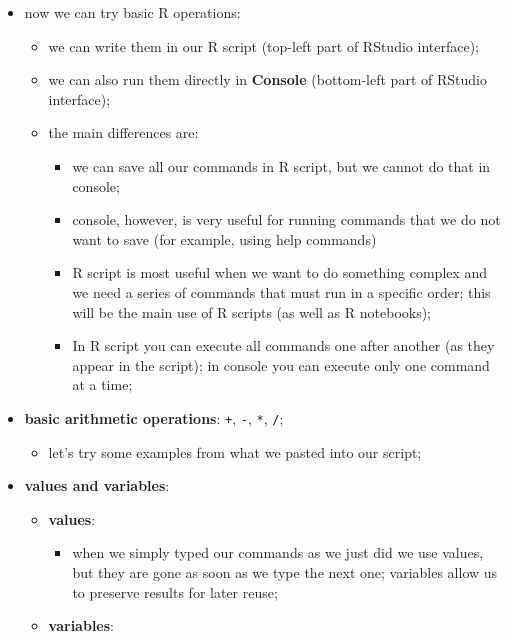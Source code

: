 \documentclass[
]{book}
\providecommand{\tightlist}{%
  \setlength{\itemsep}{0pt}\setlength{\parskip}{0pt}}
\begin{document}
\begin{itemize}
\tightlist
\item
  now we can try basic R operations:

  \begin{itemize}
  \tightlist
  \item
    we can write them in our R script (top-left part of RStudio interface);
  \item
    we can also run them directly in \textbf{Console} (bottom-left part of RStudio interface);
  \item
    the main differences are:

    \begin{itemize}
    \tightlist
    \item
      we can save all our commands in R script, but we cannot do that in console;
    \item
      console, however, is very useful for running commands that we do not want to save (for example, using help commands)
    \item
      R script is most useful when we want to do something complex and we need a series of commands that must run in a specific order; this will be the main use of R scripts (as well as R notebooks);
    \item
      In R script you can execute all commands one after another (as they appear in the script); in console you can execute only one command at a time;
    \end{itemize}
  \end{itemize}
\item
  \textbf{basic arithmetic operations}: \texttt{+}, \texttt{-}, \texttt{*}, \texttt{/};

  \begin{itemize}
  \tightlist
  \item
    let's try some examples from what we pasted into our script;
  \end{itemize}
\item
  \textbf{values and variables}:

  \begin{itemize}
  \tightlist
  \item
    \textbf{values}:

    \begin{itemize}
    \tightlist
    \item
      when we simply typed our commands as we just did we use values, but they are gone as soon as we type the next one; variables allow us to preserve results for later reuse;
    \end{itemize}
  \item
    \textbf{variables}:


\end{itemize}
\end{itemize}
\end{document}
